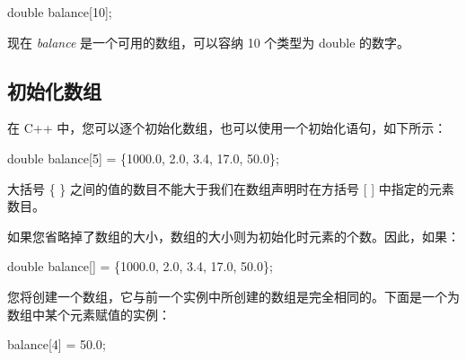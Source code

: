 \documentclass[
]{article}
\newenvironment{Shaded}{}{}
\newcommand{\DataTypeTok}[1]{\textcolor[rgb]{0.56,0.13,0.00}{#1}}
\newcommand{\DecValTok}[1]{\textcolor[rgb]{0.25,0.63,0.44}{#1}}
\newcommand{\FloatTok}[1]{\textcolor[rgb]{0.25,0.63,0.44}{#1}}
\newcommand{\NormalTok}[1]{#1}
\newcommand{\OperatorTok}[1]{\textcolor[rgb]{0.40,0.40,0.40}{#1}}
\begin{document}
\begin{Shaded}
\begin{Highlighting}[]
\DataTypeTok{double}\NormalTok{ balance}\OperatorTok{[}\DecValTok{10}\OperatorTok{];}
\end{Highlighting}
\end{Shaded}

现在 \emph{balance} 是一个可用的数组，可以容纳 10 个类型为 double
的数字。

\hypertarget{ux521dux59cbux5316ux6570ux7ec4}{%
\subsection{初始化数组}\label{ux521dux59cbux5316ux6570ux7ec4}}

在 C++ 中，您可以逐个初始化数组，也可以使用一个初始化语句，如下所示：

\begin{Shaded}
\begin{Highlighting}[]
\DataTypeTok{double}\NormalTok{ balance}\OperatorTok{[}\DecValTok{5}\OperatorTok{]} \OperatorTok{=} \OperatorTok{\{}\FloatTok{1000.0}\OperatorTok{,} \FloatTok{2.0}\OperatorTok{,} \FloatTok{3.4}\OperatorTok{,} \FloatTok{17.0}\OperatorTok{,} \FloatTok{50.0}\OperatorTok{\};}
\end{Highlighting}
\end{Shaded}

大括号 \{ \} 之间的值的数目不能大于我们在数组声明时在方括号 {[} {]}
中指定的元素数目。

如果您省略掉了数组的大小，数组的大小则为初始化时元素的个数。因此，如果：

\begin{Shaded}
\begin{Highlighting}[]
\DataTypeTok{double}\NormalTok{ balance}\OperatorTok{[]} \OperatorTok{=} \OperatorTok{\{}\FloatTok{1000.0}\OperatorTok{,} \FloatTok{2.0}\OperatorTok{,} \FloatTok{3.4}\OperatorTok{,} \FloatTok{17.0}\OperatorTok{,} \FloatTok{50.0}\OperatorTok{\};}
\end{Highlighting}
\end{Shaded}

您将创建一个数组，它与前一个实例中所创建的数组是完全相同的。下面是一个为数组中某个元素赋值的实例：

\begin{Shaded}
\begin{Highlighting}[]
\NormalTok{balance}\OperatorTok{[}\DecValTok{4}\OperatorTok{]} \OperatorTok{=} \FloatTok{50.0}\OperatorTok{;}
\end{Highlighting}
\end{Shaded}
\end{document}
